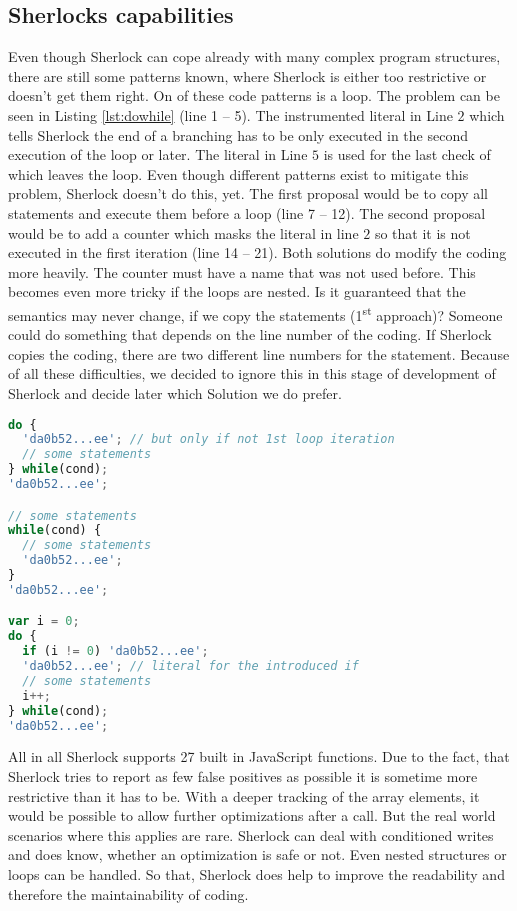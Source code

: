 \subsection{Sherlocks capabilities}
Even though Sherlock can cope already with many complex program structures, there are still some patterns known, where Sherlock is either too restrictive or doesn't get them right. 
On of these code patterns is a  loop. The problem can be seen in Listing \ref{lst:dowhile} (line 1 -- 5). The instrumented literal in Line $2$ which tells Sherlock the end of a branching has to be only executed in the second execution of the loop or later. The literal in Line $5$ is used for the last check of  which leaves the loop. Even though different patterns exist to mitigate this problem, Sherlock doesn't do this, yet. The first proposal would be to copy all statements and execute them before a  loop (line 7 -- 12). The second proposal would be to add a counter which masks the literal in line $2$ so that it is not executed in the first iteration (line 14 -- 21). Both solutions do modify the coding more heavily. The counter must have a name that was not used before. This becomes even more tricky if the loops are nested. Is it guaranteed that the semantics may never change, if we copy the statements (1\textsuperscript{st} approach)? Someone could do something that depends on the line number of the coding. If Sherlock copies the coding, there are two different line numbers for the statement. Because of all these difficulties, we decided to ignore this in this stage of development of Sherlock and decide later which Solution we do prefer.

\begin{lstlisting}[label=lst:dowhile,caption=Example for do-while loop and how Sherlock can handle them in future iterations.,language=Javascript]
do {
  'da0b52...ee'; // but only if not 1st loop iteration
  // some statements
} while(cond);
'da0b52...ee';

// some statements
while(cond) {
  // some statements
  'da0b52...ee';
}
'da0b52...ee';

var i = 0;
do {
  if (i != 0) 'da0b52...ee';
  'da0b52...ee'; // literal for the introduced if 
  // some statements
  i++;
} while(cond);
'da0b52...ee';
\end{lstlisting}


All in all Sherlock supports 27 built in JavaScript functions. Due to the fact, that Sherlock tries to report as few false positives as possible it is sometime more restrictive than it has to be. With a deeper tracking of the array elements, it would be possible to allow further optimizations after a  call. But the real world scenarios where this applies are rare. Sherlock can deal with conditioned writes and does know, whether an optimization is safe or not. Even nested structures or loops can be handled. So that, Sherlock does help to improve the readability and therefore the maintainability of coding.










